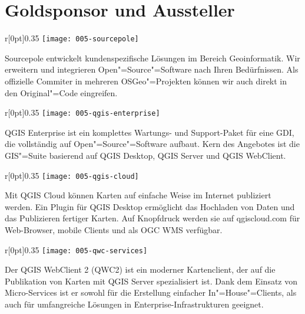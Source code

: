 \section*{Goldsponsor und Aussteller}
\newlength\sourcepoleHeight
\setlength{}
\begin{wrapfigure}[4]{r}[0pt]{0.35\textwidth}
  \centering\vspace{-1\baselineskip}
  \texttt{[image: 005-sourcepole]}
\end{wrapfigure}
Sourcepole entwickelt kundenspezifische Lösungen im Bereich Geoinformatik. Wir
erweitern und integrieren Open"=Source"=Software nach Ihren Bedürfnissen.  Als
offizielle Commiter in mehreren OSGeo"=Projekten können wir auch direkt in den
Original"=Code eingreifen.

\begin{wrapfigure}[3]{r}[0pt]{0.35\textwidth}
  \centering\vspace{-1\baselineskip}
  \texttt{[image: 005-qgis-enterprise]}
\end{wrapfigure}

QGIS Enterprise ist ein komplettes Wartungs- und Support-Paket für eine GDI,
die vollständig auf Open"=Source"=Software aufbaut.  Kern des Angebotes ist die
GIS"=Suite basierend auf QGIS Desktop, QGIS Server und QGIS WebClient.

\begin{wrapfigure}[3]{r}[0pt]{0.35\textwidth}
  \centering\vspace{-1\baselineskip}
  \texttt{[image: 005-qgis-cloud]}
\end{wrapfigure}
Mit QGIS Cloud können Karten auf einfache Weise im Internet publiziert werden.
Ein Plugin für QGIS Desktop ermöglicht das Hochladen von Daten und das
Publizieren fertiger Karten. Auf Knopfdruck werden sie auf qgiscloud.com für
Web-Browser, mobile Clients und als OGC WMS verfügbar.


\begin{wrapfigure}[7]{r}[0pt]{0.35\textwidth}
  \centering%
  \texttt{[image: 005-qwc-services]}
\end{wrapfigure}
Der QGIS WebClient 2 (QWC2) ist ein moderner Kartenclient, der auf die
Publikation von Karten mit QGIS Server spezialisiert ist. Dank dem Einsatz von
Micro-Services ist er sowohl für die Erstellung einfacher In"=House"=Clients, als
auch für umfangreiche Lösungen in Enterprise-Infrastrukturen geeignet.
